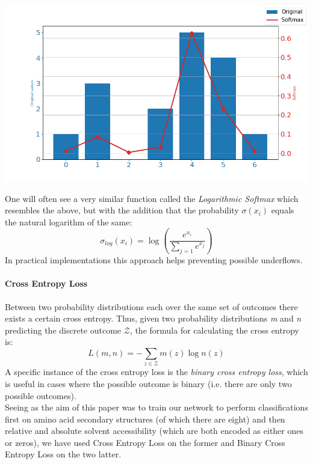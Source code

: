 \begin{multicols}{2}
\begin{Figure}
 \centering
 \includegraphics[width=\linewidth]{../graphs/softmax}
 \captionsetup{width=0.8\linewidth, font=small}
\end{Figure}
One will often see a very similar function called the \textit{Logarithmic Softmax} which resembles the above, but with the addition that the probability $\sigma(x_i)$ equals the natural logarithm of the same:
\[
\sigma_{log}\left(x_{i}\right)=\log \left(\frac{e^{ x_{i}}}{\sum_{j=1} e^{ x_{j}}}\right)
\]
In practical implementations this approach helps preventing possible underflows.



\paragraph{Cross Entropy Loss}
Between two probability distributions each over the same set of outcomes there exists a certain cross entropy.
Thus, given two probability distributions \textit{m} and \textit{n} predicting the discrete outcome $\mathcal{Z}$, the formula for calculating the cross entropy is:
$$L ( m , n ) = - \sum _ { z \in \mathcal { Z } } m ( z ) \log n ( z )$$
A specific instance of the cross entropy loss is the \textit{binary cross entropy loss}, which is useful in cases where the possible outcome is binary (i.e. there are only two possible outcomes). 
\\
Seeing as the aim of this paper was to train our network to perform classifications first on amino acid secondary structures (of which there are eight) and then relative and absolute solvent accessibility (which are both encoded as either ones or zeros), we have used Cross Entropy Loss on the former and Binary Cross Entropy Loss on the two latter.



\end{multicols}
